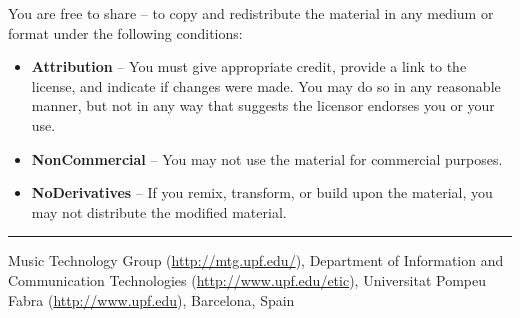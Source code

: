 \noindent You are free to share -- to copy and redistribute the material in any medium or format under the following conditions:
\begin{itemize}
\item \textbf{Attribution} -- You must give appropriate credit, provide a link to the license, and indicate if changes were made. You may do so in any reasonable manner, but not in any way that suggests the licensor endorses you or your use.
\item \textbf{NonCommercial} -- You may not use the material for commercial purposes.
\item \textbf{NoDerivatives} -- If you remix, transform, or build upon the material, you may not distribute the modified material.
\end{itemize}
\vspace{1cm}
\hrule
\vspace{0.2em}
{\footnotesize \noindent Music Technology Group (\url{http://mtg.upf.edu/}), Department of Information and Communication Technologies (\url{http://www.upf.edu/etic}), Universitat Pompeu Fabra (\url{http://www.upf.edu}), Barcelona, Spain\par}
% 




